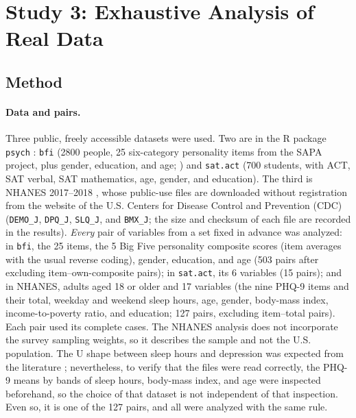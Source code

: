 \documentclass[man,mask,donotrepeattitle,floatsintext]{apa7}
\begin{document}
\section{Study 3: Exhaustive Analysis of Real Data}

\subsection{Method}

\paragraph{Data and pairs.} Three public, freely accessible datasets were used. Two are in the R package \texttt{psych} \parencite{revelle2024psych}: \texttt{bfi} (2800 people, 25 six-category personality items from the SAPA project, plus gender, education, and age; \cite{revelle2010sapa}) and \texttt{sat.act} (700 students, with ACT, SAT verbal, SAT mathematics, age, gender, and education). The third is NHANES 2017--2018 \parencite{nhanes2017}, whose public-use files are downloaded without registration from the website of the U.S. Centers for Disease Control and Prevention (CDC) (\texttt{DEMO\_J}, \texttt{DPQ\_J}, \texttt{SLQ\_J}, and \texttt{BMX\_J}; the size and checksum of each file are recorded in the results). \emph{Every} pair of variables from a set fixed in advance was analyzed: in \texttt{bfi}, the 25 items, the 5 Big Five personality composite scores (item averages with the usual reverse coding), gender, education, and age (503 pairs after excluding item--own-composite pairs); in \texttt{sat.act}, its 6 variables (15 pairs); and in NHANES, adults aged 18 or older and 17 variables (the nine PHQ-9 items \parencite{kroenke2001} and their total, weekday and weekend sleep hours, age, gender, body-mass index, income-to-poverty ratio, and education; 127 pairs, excluding item--total pairs). Each pair used its complete cases. The NHANES analysis does not incorporate the survey sampling weights, so it describes the sample and not the U.S. population. The U shape between sleep hours and depression was expected from the literature \parencite{zhai2015}; nevertheless, to verify that the files were read correctly, the PHQ-9 means by bands of sleep hours, body-mass index, and age were inspected beforehand, so the choice of that dataset is not independent of that inspection. Even so, it is one of the 127 pairs, and all were analyzed with the same rule.
\end{document}
